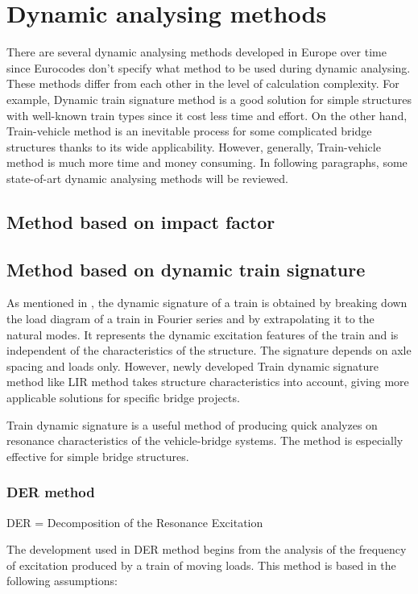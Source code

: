 \section{Dynamic analysing methods}\label{sec:dynamic-analysing-methods}
There are several dynamic analysing methods developed in Europe over time since Eurocodes don't specify what method to be used during dynamic analysing. These methods differ from each other in the level of calculation complexity. For example, Dynamic train signature method is a good solution for simple structures with well-known train types since it cost less time and effort. On the other hand, Train-vehicle method is an inevitable process for some complicated bridge structures thanks to its wide applicability. However, generally, Train-vehicle method is much more time and money consuming. In following paragraphs, some state-of-art dynamic analysing methods will be reviewed.


\subsection{Method based on impact factor}

\subsection{Method based on dynamic train signature}
As mentioned in \cite[A.4.3]{uic}, the dynamic signature of a train is obtained by breaking down the load diagram of a train in Fourier series and by extrapolating it to the natural modes. It represents the dynamic excitation features of the train and is independent of the characteristics of the structure. The signature depends on axle spacing and loads only. However, newly developed Train dynamic signature method like LIR method takes structure characteristics into account, giving more applicable solutions for specific bridge projects.

Train dynamic signature is a useful method of producing quick analyzes on resonance characteristics of the vehicle-bridge systems. The method is especially effective for simple bridge structures.

\subsubsection{DER method}

DER = Decomposition of the Resonance Excitation

The development used in DER method begins from the analysis of the frequency of excitation produced by a train of moving loads. This method is based in the following assumptions:


